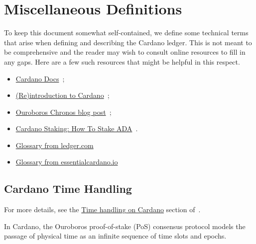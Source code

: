 \section{Miscellaneous Definitions}
\label{sec:misc-defs}
To keep this document somewhat self-contained, we define some technical terms that
arise when defining and describing the Cardano ledger.
This is not meant to be comprehensive and the reader may wish to consult
online resources to fill in any gaps.  Here are a few such resources that might be
helpful in this respect.

\begin{itemize}
  \item
        \href{https://docs.cardano.org/}%
             {Cardano Docs}~\cite{www-docs-cardano};
  \item
        \href{https://developers.cardano.org/docs/operate-a-stake-pool/introduction-to-cardano/}%
             {(Re)introduction to Cardano}~\cite{www-developers-cardano-reintro};
  \item
        \href{https://iohk.io/en/blog/posts/2021/10/27/ouroboros-chronos-provides-the-first-high-resilience-cryptographic-time-source-based-on-blockchain/}%
             {Ouroboros Chronos blog post}~\cite{www-iohk-blog-ouroboros};
  \item
        \href{https://www.ledger.com/academy/cardano-staking-how-to-stake-ada}%
             {Cardano Staking: How To Stake ADA}~\cite{www-ledger-academy-stake-ada}.
  \item
        \href{https://www.ledger.com/academy/glossary}%
             {Glossary from ledger.com}~\cite{www-ledger-academy-glossary}
  \item
        \href{https://www.essentialcardano.io/glossary?sort=alphabetical}%
             {Glossary from essentialcardano.io}~\cite{www-essential-cardano-glossary}

\end{itemize}

\subsection{Cardano Time Handling}
\label{sec:cardano-time-handling}

For more details, see the
\href{https://docs.cardano.org/about-cardano/explore-more/time}%
     {Time handling on Cardano} section of~\cite{www-docs-cardano-time}.

In Cardano, the Ouroboros proof-of-stake (PoS) consensus protocol models the passage
of physical time as an infinite sequence of time slots and epochs.

